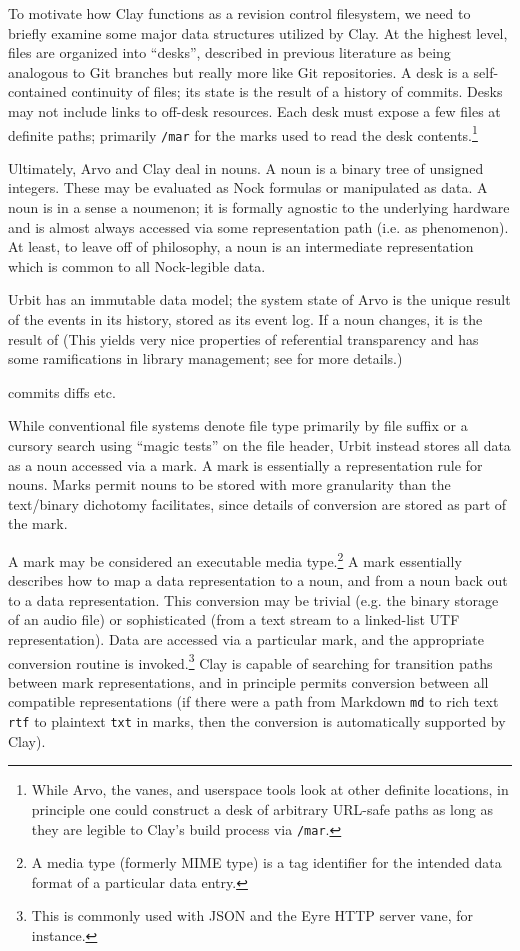 \documentclass[twoside]{article}
\begin{document}
To motivate how Clay functions as a revision control filesystem, we need to briefly examine some major data structures utilized by Clay.  At the highest level, files are organized into “desks”, described in previous literature as being analogous to Git branches but really more like Git repositories.  A desk is a self-contained continuity of files; its state is the result of a history of commits.  Desks may not include links to off-desk resources.  Each desk must expose a few files at definite paths; primarily \texttt{/mar} for the marks used to read the desk contents.\footnote{While Arvo, the vanes, and userspace tools look at other definite locations, in principle one could construct a desk of arbitrary URL-safe paths as long as they are legible to Clay's build process via \texttt{/mar}.}

Ultimately, Arvo and Clay deal in nouns.  A noun is a binary tree of unsigned integers.  These may be evaluated as Nock formulas or manipulated as data.  A noun is in a sense a noumenon; it is formally agnostic to the underlying hardware and is almost always accessed via some representation path (i.e. as phenomenon).  At least, to leave off of philosophy, a noun is an intermediate representation which is common to all Nock-legible data.

Urbit has an immutable data model; the system state of Arvo is the unique result of the events in its history, stored as its event log.  If a noun changes, it is the result of 
(This yields very nice properties of referential transparency and has some ramifications in library management; see \citet{Blackman2024} for more details.)

commits
diffs
etc.

While conventional file systems denote file type primarily by file suffix or a cursory search using “magic tests” on the file header, Urbit instead stores all data as a noun accessed via a mark.  A mark is essentially a representation rule for nouns.  Marks permit nouns to be stored with more granularity than the text/binary dichotomy facilitates, since details of conversion are stored as part of the mark.

A mark may be considered an executable media type.\footnote{A media type (formerly MIME type) is a tag identifier for the intended data format of a particular data entry.}  A mark essentially describes how to map a data representation to a noun, and from a noun back out to a data representation.  This conversion may be trivial (e.g. the binary storage of an audio file) or sophisticated (from a text stream to a linked-list UTF representation).  Data are accessed via a particular mark, and the appropriate conversion routine is invoked.\footnote{This is commonly used with JSON and the Eyre HTTP server vane, for instance.}  Clay is capable of searching for transition paths between mark representations, and in principle permits conversion between all compatible representations (if there were a path from Markdown \texttt{md} to rich text \texttt{rtf} to plaintext \texttt{txt} in marks, then the conversion is automatically supported by Clay).
\end{document}

